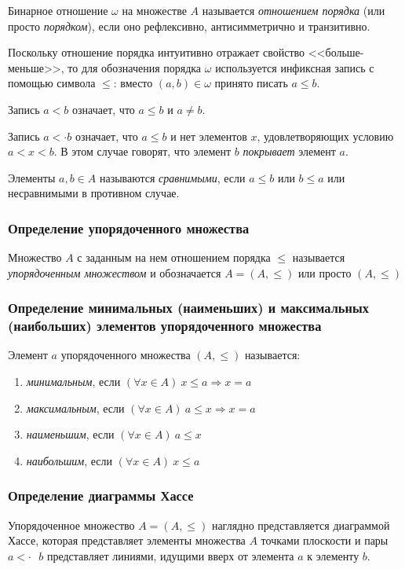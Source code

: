 \documentclass[bachelor, och, labwork]{shiza}
\begin{document}
Бинарное отношение $\omega$ на множестве $A$ называется \textit{отношением порядка}
(или просто \textit{порядком}), если оно рефлексивно, антисимметрично и транзитивно.

Поскольку отношение порядка интуитивно отражает свойство <<больше-меньше>>, то для
обозначения порядка $\omega$ используется инфиксная запись с помощью символа 
$\leq$: вместо $(a,b)\in \omega$ принято писать $a\leq b$.

Запись $a < b$ означает, что $a \le b$ и $a \not = b$.

Запись $a <\cdot b$ означает, что $a \le b$ и нет элементов $x$, удовлетворяющих
условию $a < x < b$. В этом случае говорят, что элемент $b$ \textit{покрывает} 
элемент $a$.

Элементы $a,b\in A$ называются \textit{сравнимыми}, если $a \le b$ или $b \le a$
или несравнимыми в противном случае.

\subsubsection{Определение упорядоченного множества}
Множество $A$ с заданным на нем отношением порядка $\le$ называется
\textit{упорядоченным множеством} и обозначается $A=(A,\le)$ или просто $(A,\le)$

\subsubsection{Определение минимальных (наименьших) и максимальных (наибольших) элементов упорядоченного множества}

Элемент $a$ упорядоченного множества $(A,\le)$ называется:
\begin{enumerate}
    \item \textit{минимальным}, если $(\forall x \in A) ~x \le a \Rightarrow x = a$
    \item \textit{максимальным}, если $(\forall x \in A) ~a \le x \Rightarrow x = a$
    \item \textit{наименьшим}, если $(\forall x \in A) ~a \le x$
    \item \textit{наибольшим}, если $(\forall x \in A) ~x \le a$
\end{enumerate}


\subsubsection{Определение диаграммы Хассе}

Упорядоченное множество $A = (A, \leq)$ наглядно представляется диаграммой Хассе, 
которая представляет элементы множества $A$ точками плоскости и пары $a <\cdot \text{ } b$ 
представляет линиями, идущими вверх от элемента $a$ к элементу $b$.
\end{document}
